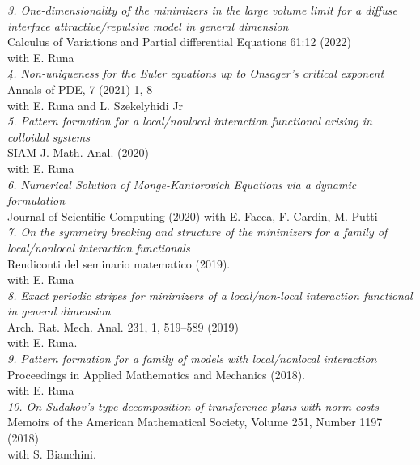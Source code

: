 \documentclass[10pt]{article}
\begin{document}
\textsl{3. One-dimensionality of the minimizers in the large volume limit for a diffuse interface attractive/repulsive model in general dimension}\\
Calculus of Variations and Partial differential Equations 61:12 (2022)\\
with E. Runa\\

\textsl{4. 	Non-uniqueness for the Euler equations up to Onsager's critical exponent}\\
Annals of PDE, 7 (2021) 1, 8\\
with  E. Runa and  L. Szekelyhidi Jr \\


\textsl{5. Pattern formation for a local/nonlocal interaction functional arising in colloidal systems}\\
SIAM J. Math. Anal. (2020)\\
with E. Runa\\

\textsl{6. Numerical Solution of Monge-Kantorovich Equations via a dynamic formulation  }\\
Journal of Scientific Computing (2020)
with E. Facca, F. Cardin, M. Putti\\

\textsl{7. On the symmetry breaking and structure of the minimizers for a family of local/nonlocal interaction functionals}\\
Rendiconti del seminario matematico (2019).\\
with E. Runa\\

\textsl{8. Exact periodic stripes for  minimizers of a local/non-local interaction functional in general dimension}\\
Arch. Rat. Mech. Anal. 231, 1, 519--589 (2019)\\
with E. Runa.\\

\textsl{9. Pattern formation for a family of models with local/nonlocal interaction}\\
Proceedings in Applied Mathematics and Mechanics (2018).\\
with E. Runa\\

\textsl{10. On Sudakov's type decomposition of transference plans with norm costs}\\
Memoirs of the American Mathematical Society, Volume 251, Number 1197 (2018)\\
with S. Bianchini.\\
\end{document}
